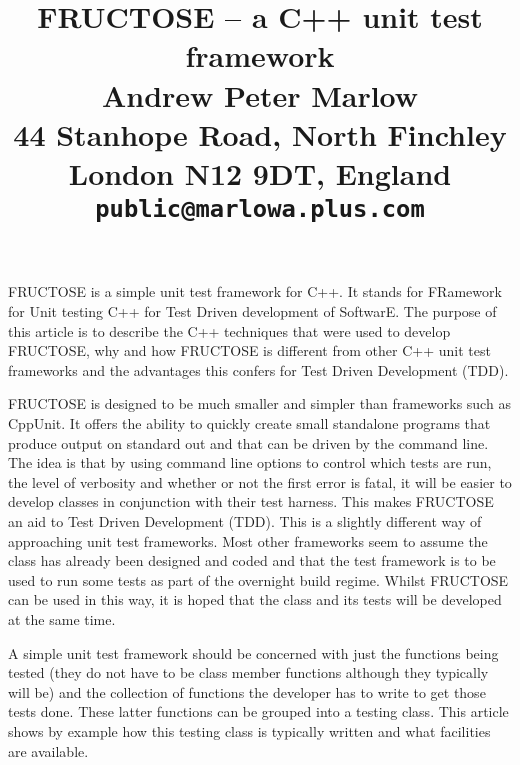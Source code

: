 \documentclass{book}
\begin{document}
 
\title{FRUCTOSE -- a C++ unit test framework \\
Andrew Peter Marlow \\
44 Stanhope Road, North Finchley \\ 
London N12 9DT, England \\ 
{\tt public@marlowa.plus.com}} 
\maketitle 
% 

\tableofcontents

\vfil\eject




FRUCTOSE is a simple unit test framework for C++. 
It stands for FRamework for Unit testing C++ for Test Driven
development of SoftwarE. 
The purpose of this article is to describe the C++ techniques that
were used to develop FRUCTOSE, why and how FRUCTOSE is different
from other C++ unit test frameworks and the advantages this confers
for Test Driven Development (TDD).

FRUCTOSE is designed to be much smaller and simpler than frameworks such as
CppUnit. It offers the ability to quickly create small standalone programs that
produce output on standard out and that can be  driven by the command line. 
The idea is that by using command line options
to control which tests are run, the level of verbosity and whether or not
the first error is fatal, it will be easier to develop classes in conjunction
with their test harness. This makes FRUCTOSE an aid to Test Driven
Development (TDD).
This is a slightly different way of approaching unit test frameworks.
Most other frameworks seem to assume the class has already been designed
and coded and that the test framework is to be used to run some tests as
part of the overnight build regime. Whilst FRUCTOSE can be used in this way,
it is hoped that the class and its tests will be developed at the same time.

A simple unit test framework should be concerned with just the functions being
tested (they do not have to be class member functions although they typically
will be) and the collection of functions the developer has to write to get
those tests done. These latter functions can be grouped into a testing class.
This article shows by example how this testing class is typically written
and what facilities are available.
\end{document}
